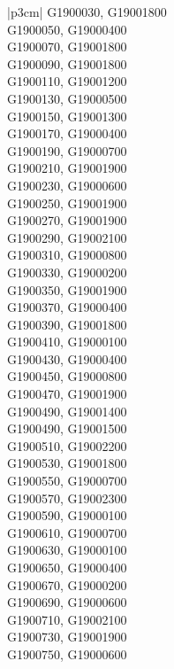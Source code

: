 \begin{customLongTable}{ |p{3cm}| }
G1900030, G19001800 \\ \hline
G1900050, G19000400 \\ \hline
G1900070, G19001800 \\ \hline
G1900090, G19001800 \\ \hline
G1900110, G19001200 \\ \hline
G1900130, G19000500 \\ \hline
G1900150, G19001300 \\ \hline
G1900170, G19000400 \\ \hline
G1900190, G19000700 \\ \hline
G1900210, G19001900 \\ \hline
G1900230, G19000600 \\ \hline
G1900250, G19001900 \\ \hline
G1900270, G19001900 \\ \hline
G1900290, G19002100 \\ \hline
G1900310, G19000800 \\ \hline
G1900330, G19000200 \\ \hline
G1900350, G19001900 \\ \hline
G1900370, G19000400 \\ \hline
G1900390, G19001800 \\ \hline
G1900410, G19000100 \\ \hline
G1900430, G19000400 \\ \hline
G1900450, G19000800 \\ \hline
G1900470, G19001900 \\ \hline
G1900490, G19001400 \\ \hline
G1900490, G19001500 \\ \hline
G1900510, G19002200 \\ \hline
G1900530, G19001800 \\ \hline
G1900550, G19000700 \\ \hline
G1900570, G19002300 \\ \hline
G1900590, G19000100 \\ \hline
G1900610, G19000700 \\ \hline
G1900630, G19000100 \\ \hline
G1900650, G19000400 \\ \hline
G1900670, G19000200 \\ \hline
G1900690, G19000600 \\ \hline
G1900710, G19002100 \\ \hline
G1900730, G19001900 \\ \hline
G1900750, G19000600 \\ \hline

\end{customLongTable}
